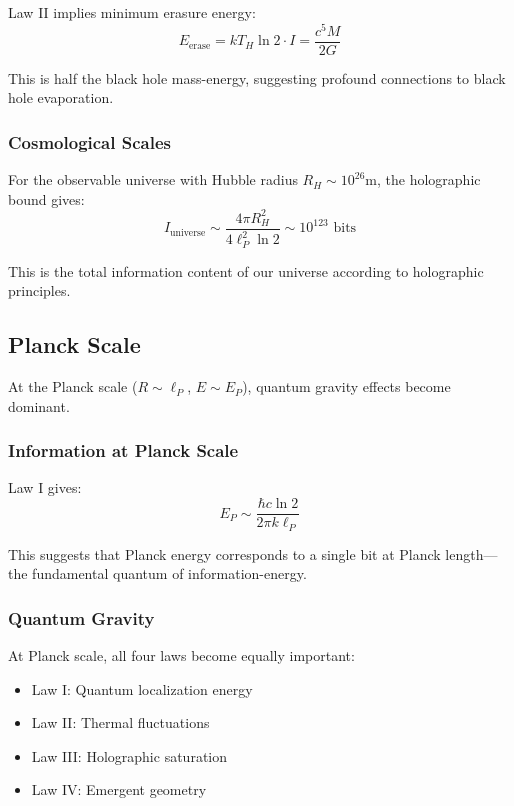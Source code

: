 \documentclass[11pt,a4paper]{article}
\theoremstyle{plain}
\theoremstyle{definition}
\theoremstyle{remark}
\begin{document}
Law II implies minimum erasure energy:
\begin{equation}
E_{\text{erase}} = kT_H\ln 2\cdot I = \frac{c^5M}{2G}
\end{equation}

This is half the black hole mass-energy, suggesting profound connections to black hole evaporation.

\subsubsection{Cosmological Scales}

For the observable universe with Hubble radius $R_H \sim 10^{26}$m, the holographic bound gives:
\begin{equation}
I_{\text{universe}} \sim \frac{4\pi R_H^2}{4\ell_P^2\ln 2} \sim 10^{123}\text{ bits}
\end{equation}

This is the total information content of our universe according to holographic principles.

\subsection{Planck Scale}

At the Planck scale ($R \sim \ell_P$, $E \sim E_P$), quantum gravity effects become dominant.

\subsubsection{Information at Planck Scale}

Law I gives:
\begin{equation}
E_P \sim \frac{\hbar c\ln 2}{2\pi k\ell_P}
\end{equation}

This suggests that Planck energy corresponds to a single bit at Planck length—the fundamental quantum of information-energy.

\subsubsection{Quantum Gravity}

At Planck scale, all four laws become equally important:
\begin{itemize}[leftmargin=*]
\item Law I: Quantum localization energy
\item Law II: Thermal fluctuations
\item Law III: Holographic saturation
\item Law IV: Emergent geometry
\end{itemize}
\end{document}
